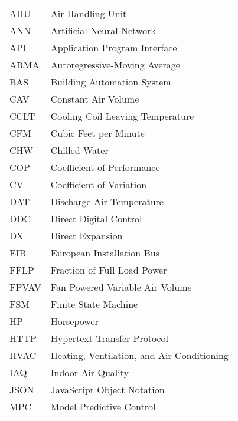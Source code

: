 \begin{longtable}{ll}
AHU          & Air Handling Unit\tabularnewline
ANN          & Artificial Neural Network                                 \\
API          & Application Program Interface                             \\
ARMA         & Autoregressive-Moving Average                             \\
BAS          & Building Automation System\tabularnewline
CAV          & Constant Air Volume                                       \\
CCLT         & Cooling Coil Leaving Temperature                          \\
CFM          & Cubic Feet per Minute                                     \\
CHW          & Chilled Water                                             \\
COP          & Coefficient of Performance                                \\
CV           & Coefficient of Variation                                  \\
DAT          & Discharge Air Temperature                                 \\
DDC          & Direct Digital Control                                    \\
DX           & Direct Expansion                                          \\
EIB          & European Installation Bus                                 \\
FFLP         & Fraction of Full Load Power                               \\
FPVAV        & Fan Powered Variable Air Volume                           \\
FSM          & Finite State Machine                                      \\
HP           & Horsepower                                                \\
HTTP         & Hypertext Transfer Protocol                               \\
HVAC         & Heating, Ventilation, and Air-Conditioning\tabularnewline
IAQ          & Indoor Air Quality                                        \\
JSON         & JavaScript Object Notation                                \\
MPC          & Model Predictive Control                                  \\

\end{longtable}

